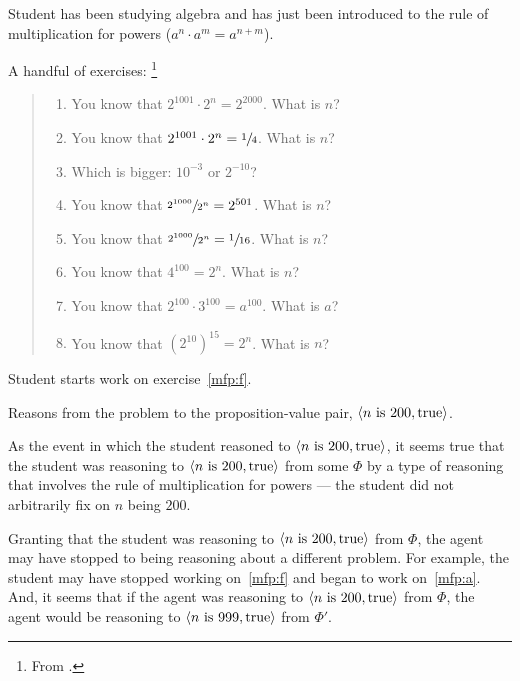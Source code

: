 \begin{note}
  \begin{illustration}[Textbook]
    Student has been studying algebra and has just been introduced to the rule of multiplication for powers (\(a^{n} \cdot a^{m} = a^{n + m}\)).

    A handful of exercises:%
    \footnote{
      From \textcite[31]{Gelfand:1993aa}.
    }

    \begin{quote}
      \begin{enumerate}[label=(\alph*), ref=(\alph*)]
      \item
        \label{mfp:a}
        You know that \(2^{1001} \cdot 2^{n} = 2^{2000}\).
        What is \(n\)?
      \item
        \label{mfp:b}
        You know that \(2^{1001} \cdot 2^{n} = \sfrac{1}{4}\).
        What is \(n\)?
      \item
        \label{mfp:c}
        Which is bigger: \(10^{-3}\) or \(2^{-10}\)?
      \item
        \label{mfp:d}
        You know that \(\sfrac{2^{1000}}{2^{n}} = 2^{501}\).
        What is \(n\)?
      \item
        \label{mfp:e}
        You know that \(\sfrac{2^{1000}}{2^{n}} = \sfrac{1}{16}\).
        What is \(n\)?
      \item
        \label{mfp:f}
        You know that \(4^{100} = 2^{n}\).
        What is \(n\)?
      \item
        \label{mfp:g}
        You know that \(2^{100} \cdot 3^{100} = a^{100}\).
        What is \(a\)?
      \item
        \label{mfp:h}
        You know that \((2^{10})^{15} = 2^{n}\).
        What is \(n\)?
      \end{enumerate}
    \end{quote}

    Student starts work on exercise~\ref{mfp:f}.

    Reasons from the problem to the proposition-value pair, \(\langle n\text{ is }200, \text{true} \rangle\).

    As the event in which the student reasoned to \(\langle n\text{ is }200, \text{true} \rangle\), it seems true that the student was reasoning to \(\langle n\text{ is }200, \text{true} \rangle\) from some \poP{} \(\Phi\) by a type of reasoning that involves the rule of multiplication for powers --- the student did not arbitrarily fix on \(n\) being \(200\).

    Granting that the student was reasoning to \(\langle n\text{ is }200, \text{true} \rangle\) from \(\Phi\), the agent may have stopped to being reasoning about a different problem.
    For example, the student may have stopped working on~\ref{mfp:f} and began to work on~\ref{mfp:a}.
    And, it seems that if the agent was reasoning to \(\langle n\text{ is }200, \text{true} \rangle\) from \(\Phi\), the agent would be reasoning to \(\langle n\text{ is }999, \text{true} \rangle\) from \(\Phi'\).


\end{illustration}
\end{note}
